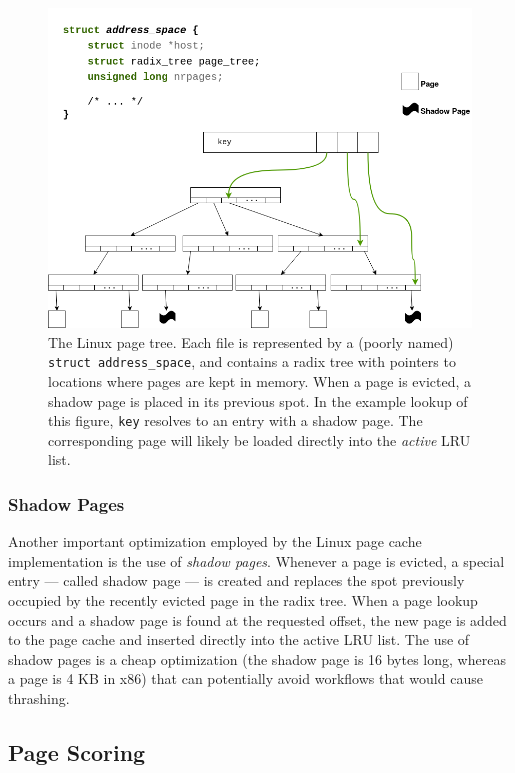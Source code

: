 \begin{figure}[h]
  \includegraphics[scale=0.3]{img/LinuxRadixTree.png}
  \caption{The Linux page tree. Each file is represented by a (poorly named)
  \texttt{struct address\_space}, and contains a radix tree with pointers to
  locations where pages are kept in memory. When a page is evicted, a shadow
  page is placed in its previous spot. In the example lookup of this figure,
  \texttt{key} resolves to an entry with a shadow page. The corresponding page
  will likely be loaded directly into the \emph{active} LRU list.}
  \label{fig:radix}
\end{figure}

\subsubsection{Shadow Pages}

Another important optimization employed by the Linux page cache implementation
is the use of \emph{shadow pages}. Whenever a page is evicted, a special entry
--- called shadow page --- is created and replaces the spot previously occupied
by the recently evicted page in the radix tree. When a page lookup occurs and a
shadow page is found at the requested offset, the new page is added to the page
cache and inserted directly into the active LRU list. The use of shadow pages
is a cheap optimization (the shadow page is 16 bytes long, whereas a page is 4 KB
in x86) that can potentially avoid workflows that would cause thrashing.

\subsection{Page Scoring}

